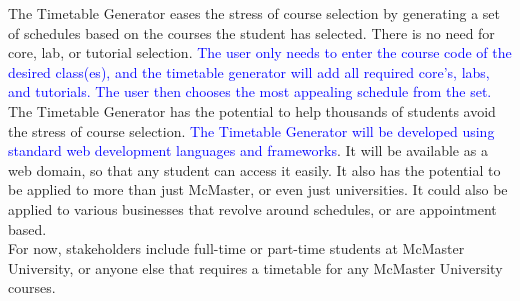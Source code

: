 \documentclass[12pt]{article}
\begin{document}
The Timetable Generator eases the stress of course selection by generating a set of schedules based on the courses the student has selected. There is no need for core, lab, or tutorial selection. \textcolor{blue}{ The user only needs to enter the course code of the desired class(es), and the timetable generator will add all required core's, labs, and tutorials. The user then chooses the most appealing schedule from the set.} \\

The Timetable Generator has the potential to help thousands of students avoid the stress of course selection. \textcolor{blue}{The Timetable Generator will be developed using standard web development languages and frameworks}. It will be available as a web domain, so that any student can access it easily. It also has the potential to be applied to more than just McMaster, or even just universities. It could also be applied to various businesses that revolve around schedules, or are appointment based.  \\

For now, stakeholders include full-time or part-time students at McMaster University, or anyone else that requires a timetable for any McMaster University courses.


    



\end{document}

